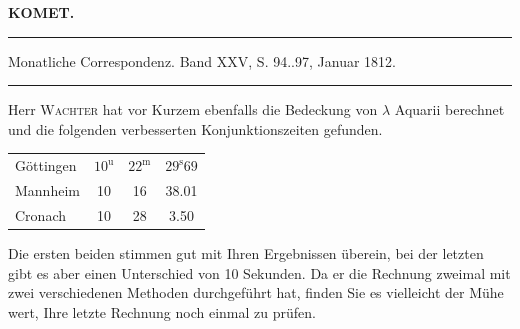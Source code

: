 \clearpage{}
\begin{center}\textbf{KOMET.}\par\vspace{4pt}\hrule\vspace{4pt}\fontsize{10}{12}\selectfont Monatliche Correspondenz. Band XXV, S. 94..97, Januar 1812.\par\vspace{4pt}\hrule\vspace{4pt}\end{center}

\par{}

\par\indent Herr \textsc{Wachter} hat vor Kurzem ebenfalls die Bedeckung von $\lambda$ Aquarii berechnet und die folgenden verbesserten Konjunktionszeiten gefunden.

\begin{center}
\fontsize{10}{12}\selectfont\setlength{\tabcolsep}{6pt}\renewcommand{\arraystretch}{1.15}\begin{tabular}{l|ccc}
Göttingen & $10^{\text{u}}$ & $22^{\text{m}}$ & $29^{\text{s}}69$ \\
Mannheim & 10 & 16 & 38.01 \\
Cronach & 10 & 28 & 3.50 \\
\end{tabular}
\end{center}

\noindent Die ersten beiden stimmen gut mit Ihren Ergebnissen überein, bei der letzten gibt es aber einen Unterschied von 10 Sekunden. Da er die Rechnung zweimal mit zwei verschiedenen Methoden durchgeführt hat, finden Sie es vielleicht der Mühe wert, Ihre letzte Rechnung noch einmal zu prüfen.
